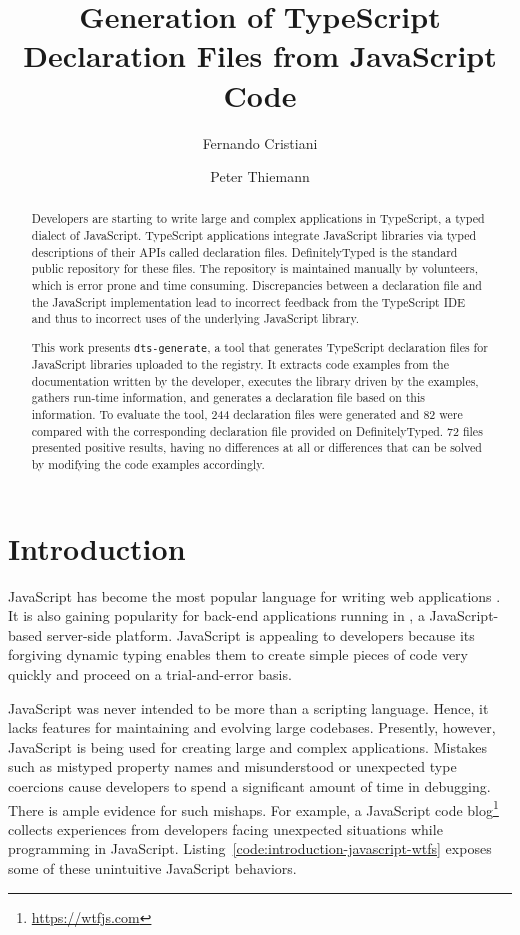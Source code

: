 \documentclass[english,cleveref,autoref,submission]{programming}
\title{Generation of TypeScript Declaration Files from JavaScript Code}
\author{Fernando Cristiani}
\affiliation{Hochschule Karlsruhe, Germany }
\author{Peter Thiemann}
\affiliation{Universität Freiburg, Germany}
\newcommand{\coderef}[1]{Listing~\ref{#1}}
\begin{document}
\maketitle

\begin{abstract}
Developers are starting to write large and complex applications in
TypeScript, a typed dialect of JavaScript. TypeScript applications
integrate JavaScript libraries via typed descriptions of their APIs
called declaration files. DefinitelyTyped is the standard public
repository for these files.
The repository is maintained manually by volunteers, which
is error prone and time consuming. Discrepancies between a
declaration file and the JavaScript implementation lead to
incorrect feedback from the TypeScript IDE and thus to incorrect uses
of the underlying JavaScript library.

This work presents \texttt{dts-generate}, a tool that generates
TypeScript declaration files for JavaScript libraries uploaded to the \NPM{}
registry. It extracts code examples from the documentation written by
the developer, executes the library driven by the examples, gathers
run-time information, and generates a declaration file based on this
information. To evaluate the tool, 244 declaration files were generated and 82 were
compared with the corresponding declaration file provided on DefinitelyTyped. 72 files presented positive results, having no differences at all or differences that can be solved by modifying the code examples accordingly.

\end{abstract}

\section{Introduction}
\label{sec:introduction}
JavaScript has become the most popular language for writing web
applications \cite{github-statistics}. It is also gaining popularity
for back-end applications running in \NodeJS{}, a JavaScript-based
server-side platform. JavaScript is appealing to developers because
its forgiving dynamic typing enables 
them to create simple pieces of code very quickly and proceed on a
trial-and-error basis.

JavaScript was never intended to be more than a
scripting language. Hence, it lacks features for maintaining and evolving large
codebases.
Presently, however, JavaScript is being used for creating large and complex
applications. 
Mistakes such as mistyped property
names and misunderstood or unexpected type coercions cause developers
to spend a significant amount of time in debugging. There is ample
evidence for such mishaps. For example, a 
JavaScript code blog\footnote{\url{https://wtfjs.com}} collects experiences
from developers facing unexpected situations while programming in
JavaScript. \coderef{code:introduction-javascript-wtfs} exposes some
of these unintuitive JavaScript behaviors. 
\end{document}
